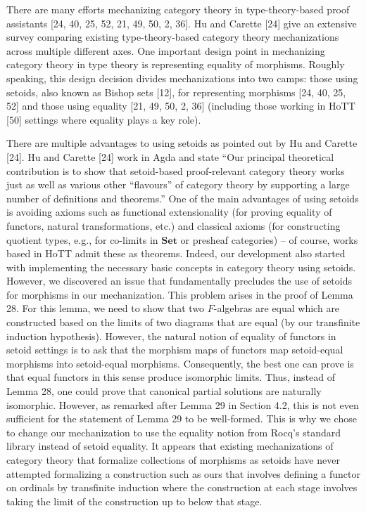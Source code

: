 There are many efforts mechanizing category theory in type-theory-based proof assistants [24, 40, 25, 52, 21, 49, 50, 2, 36]. Hu and Carette [24] give an extensive survey comparing existing type-theory-based category theory mechanizations across multiple different axes. One important design point in mechanizing category theory in type theory is representing equality of morphisms. Roughly speaking, this design decision divides mechanizations into two camps: those using setoids, also known as Bishop sets [12], for representing morphisms [24, 40, 25, 52] and those using equality [21, 49, 50, 2, 36] (including those working in HoTT [50] settings where equality plays a key role).\par
 
 
 
There are multiple advantages to using setoids as pointed out by Hu and Carette [24]. Hu and Carette [24] work in Agda and state “Our principal theoretical contribution is to show that setoid-based proof-relevant category theory works just as well as various other “flavours” of category theory by supporting a large number of definitions and theorems.” One of the main advantages of using setoids is avoiding axioms such as functional extensionality (for proving equality of functors, natural transformations, etc.) and classical axioms (for constructing quotient types, e.g., for co-limits in $\mathbf{Set}$ or presheaf categories) – of course, works based in HoTT admit these as theorems. Indeed, our development also started with implementing the necessary basic concepts in category theory using setoids. However, we discovered an issue that fundamentally precludes the use of setoids for morphisms in our mechanization. This problem arises in the proof of Lemma 28. For this lemma, we need to show that two $F$-algebras are equal which are constructed based on the limits of two diagrams that are equal (by our transfinite induction hypothesis). However, the natural notion of equality of functors in setoid settings is to ask that the morphism maps of functors map setoid-equal morphisms into setoid-equal morphisms. Consequently, the best one can prove is that equal functors in this sense produce isomorphic limits. Thus, instead of Lemma 28, one could prove that canonical partial solutions are naturally isomorphic. However, as remarked after Lemma 29 in Section 4.2, this is not even sufficient for the statement of Lemma 29 to be well-formed. This is why we chose to change our mechanization to use the equality notion from Rocq’s standard library instead of setoid equality. It appears that existing mechanizations of category theory that formalize collections of morphisms as setoids have never attempted formalizing a construction such as ours that involves defining a functor on ordinals by transfinite induction where the construction at each stage involves taking the limit of the construction up to below that stage.\par
 
